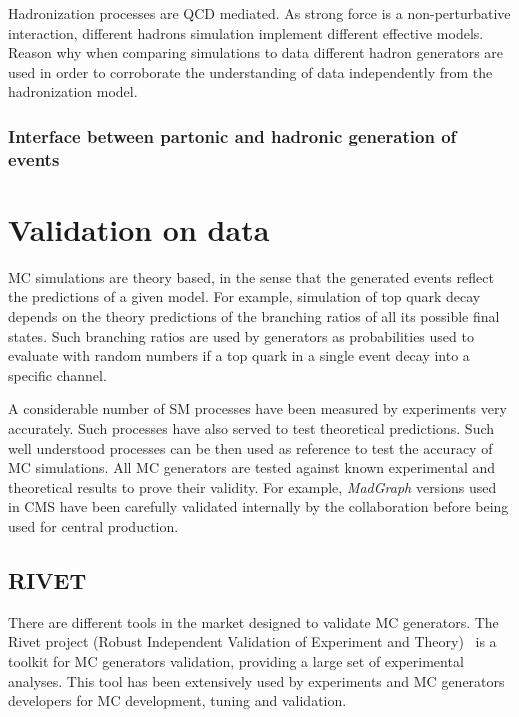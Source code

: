 Hadronization processes are QCD mediated. As strong force is a non-perturbative interaction, different hadrons simulation implement different effective models. Reason why when comparing simulations to data different hadron generators are used in order to corroborate the understanding of data independently from the hadronization model. 

\subsubsection{Interface between partonic and hadronic generation of events}
\label{sec:Merging}



\section{Validation on data}
\label{sec:val}

MC simulations are theory based, in the sense that the generated events reflect the predictions of a given model. For example, simulation of top quark decay depends on the theory predictions of the branching ratios of all its possible final states. Such branching ratios are used by generators as probabilities used to evaluate with random numbers if a top quark in a single event decay into a specific channel. 

A considerable number of SM processes have been measured by experiments very accurately. Such processes have also served to test theoretical predictions. Such well understood processes can be then used as reference to test the accuracy of MC simulations. All MC generators are tested against known experimental and theoretical results to prove their validity. For example, \textit{MadGraph} versions used in CMS have been carefully validated internally by the collaboration before being used for central production.

\subsection{RIVET}
\label{sec:rivet}

There are different tools in the market designed to validate MC generators. The Rivet project (Robust Independent Validation of Experiment and Theory)~\cite{Buckley:2010ar} is a toolkit for MC generators validation, providing a large set of experimental analyses. This tool has been extensively used by experiments and MC generators developers for MC development, tuning and validation. 

